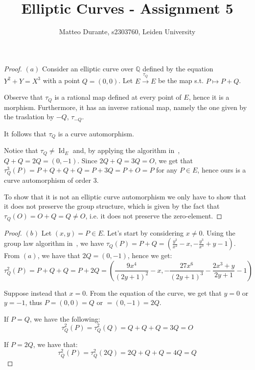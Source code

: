 \documentclass{article}
\newcommand{\numberset}{\mathbb}
\newcommand{\Q}{\numberset{Q}}
\newcommand{\exercise}[1]{\noindent {\bf Exercise #1}}
\DeclareMathOperator{\Id}{Id}
\begin{document}
\title{Elliptic Curves - Assignment 5}

\author{Matteo Durante, s2303760, Leiden University}

\maketitle


\exercise{2}

\begin{proof}
    $(a)$ Consider an elliptic curve over $\Q$ defined by the equation
    $Y^2+Y=X^3$ with a point $Q=(0,0)$. Let $E\xrightarrow{\tau_Q}E$ be the map
    s.t. $P\mapsto P+Q$.

    Observe that $\tau_Q$ is a rational map defined at every point of $E$, hence
    it is a morphism. Furthermore, it has an inverse rational map, namely the
    one given by the traslation by $-Q$, $\tau_{-Q}$.
    
    It follows that $\tau_Q$ is a curve automorphism.

    Notice that $\tau_Q\neq\Id_E$ and, by applying the algorithm
    in~\cite[III.2.3]{Sil09}, $Q+Q=2Q=(0,-1)$. Since $2Q+Q=3Q=O$, we get that
    $\tau_Q^3(P)=P+Q+Q+Q=P+3Q=P+O=P$ for any $P\in E$, hence ours is a curve
    automorphism of order 3.

    To show that it is not an elliptic curve automorphism we only have to show
    that it does not preserve the group structure, which is given by the fact
    that $\tau_Q(O)=O+Q=Q\neq O$, i.e. it does not preserve the zero-element.
\end{proof}

\begin{proof}
    $(b)$ Let $(x,y)=P\in E$. Let's start by considering $x\neq 0$. Using the
    group law algorithm in~\cite[III.2.3]{Sil09}, we have
    $\tau_Q(P)=P+Q=(\frac{y^2}{x^2}-x,-\frac{y^3}{x^3}+y-1)$. From $(a)$, we
    have that $2Q=(0,-1)$, hence we get:
    $$\tau_Q^2(P)=P+Q+Q=P+2Q=\left(\frac{9x^4}{(2y+1)^2}-x,-\frac{27x^6}{(2y+1)^3}-\frac{2x^3+y}{2y+1}-1\right)$$

    Suppose instead that $x=0$. From the equation of the curve, we get that
    $y=0$ or $y=-1$, thus $P=(0,0)=Q$ or $=(0,-1)=2Q$.

    If $P=Q$, we have the following:$$\tau_Q^2(P)=\tau_Q^2(Q)=Q+Q+Q=3Q=O$$

    If $P=2Q$, we have that:$$\tau_Q^2(P)=\tau_Q^2(2Q)=2Q+Q+Q=4Q=Q$$
\end{proof}
\end{document}
